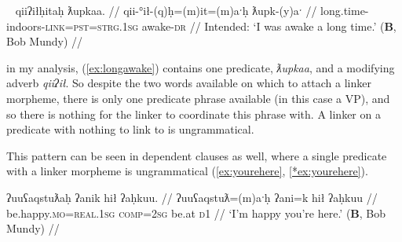 \ex~ \label{*ex:longawake2}
\begingl
\glpreamble *qiiʔiłḥitaḥ ƛupkaa. //
\gla qii-°ił-(q)ḥ=(m)it=(m)aˑḥ ƛupk-(y)aˑ //
\glb long.time-indoors-\textsc{link}=\textsc{pst}=\textsc{strg.1sg} awake-\textsc{dr} //
\glft Intended: `I was awake a long time.' (\textbf{B}, Bob Mundy) //
\endgl
\xe

\begin{comment}
\ex \label{ex:longawake}
\begingl
\glpreamble qiiʔiłs ƛupkaaqḥ. //
\gla qiiʔił=s ƛupk-(y)aˑ-(q)ḥ //
\glb lie.in.bed.a.long.time=\textsc{strg.1sg} awake-\textsc{dr}-\textsc{link} //
\glft `I lay awake inside for a long time.' (\textbf{N}, \textit{yuułnaak} Simon Lucas) //
\endgl
\xe

\ex~ \label{*ex:longawake}
\begingl
\glpreamble *ƛupkaaqḥs qii. //
\gla ƛupk-(y)aˑ-(q)ḥ=s qii //
\glb awake-\textsc{dr}-\textsc{link}=\textsc{strg.1sg} long.time //
\glft Intended: `I lay awake for a long time.' (\textbf{N}, \textit{yuułnaak} Simon Lucas) //
\endgl
\xe
\end{comment}

in my analysis, (\ref{ex:longawake}) contains one predicate, \textit{ƛupkaa}, and a modifying adverb \textit{qiiʔił}. So despite the two words available on which to attach a linker morpheme, there is only one predicate phrase available (in this case a VP), and so there is nothing for the linker to coordinate this phrase with. A linker on a predicate with nothing to link to is ungrammatical.


This pattern can be seen in dependent clauses as well, where a single predicate with a linker morpheme is  ungrammatical (\ref{ex:yourehere}, \ref{*ex:yourehere}).

\ex \label{ex:yourehere}
\begingl
\glpreamble ʔuuʕaqstuƛaḥ ʔanik hił ʔaḥkuu. //
\gla ʔuuʕaqstuƛ=(m)aˑḥ ʔani=k hił ʔaḥkuu //
\glb be.happy.\textsc{mo}=\textsc{real.1sg} \textsc{comp}=\textsc{2sg} be.at \textsc{d1} //
\glft `I'm happy you're here.' (\textbf{B}, Bob Mundy) //
\endgl
\xe

